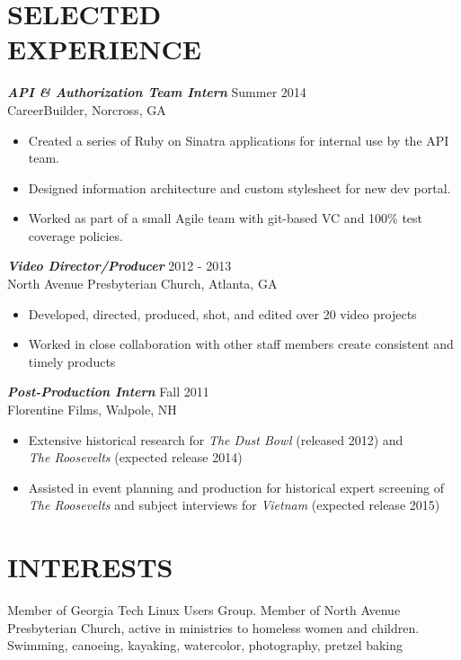 \documentclass[margin]{res}
\begin{document}
\begin{resume}
\section{SELECTED \\ EXPERIENCE}    
                {\sl \textbf{API \& Authorization Team Intern}} \hfill Summer 2014 \\
                    CareerBuilder, Norcross, GA
                 \begin{itemize}  \itemsep -2pt %
                 \item Created a series of Ruby on Sinatra applications for internal use by the API team.
                 \item Designed information architecture and custom stylesheet for new dev portal.
                 \item Worked as part of a small Agile team with git-based VC and 100\% test coverage policies.
                \end{itemize}

                {\sl \textbf{Video Director/Producer}} \hfill            2012 - 2013 \\
                 North Avenue Presbyterian Church, Atlanta, GA
                 \begin{itemize}  \itemsep -2pt %
                 \item Developed, directed, produced, shot, and edited over 20 video projects
                 \item Worked in close collaboration with other staff members create consistent and timely products
                 \end{itemize} 

                {\sl \textbf{Post-Production Intern}} \hfill       Fall 2011 \\
                Florentine Films, Walpole, NH
                  \begin{itemize}  \itemsep -2pt
                   \item Extensive historical research for {\sl The Dust Bowl} (released                                
                   2012) and\\ {\sl The Roosevelts} (expected release 2014)
                   \item Assisted in event planning and production for historical expert                                
                   screening of\\ {\sl The Roosevelts} and subject interviews for {\sl Vietnam} (expected release 2015) 
                   \end{itemize} 
 
\section{INTERESTS}  Member of Georgia Tech Linux Users Group. Member of North Avenue Presbyterian Church, 
                    active in ministries to homeless women and children. \\Swimming, canoeing, kayaking, watercolor, photography, pretzel baking\\
   

\end{resume}
\end{document}

